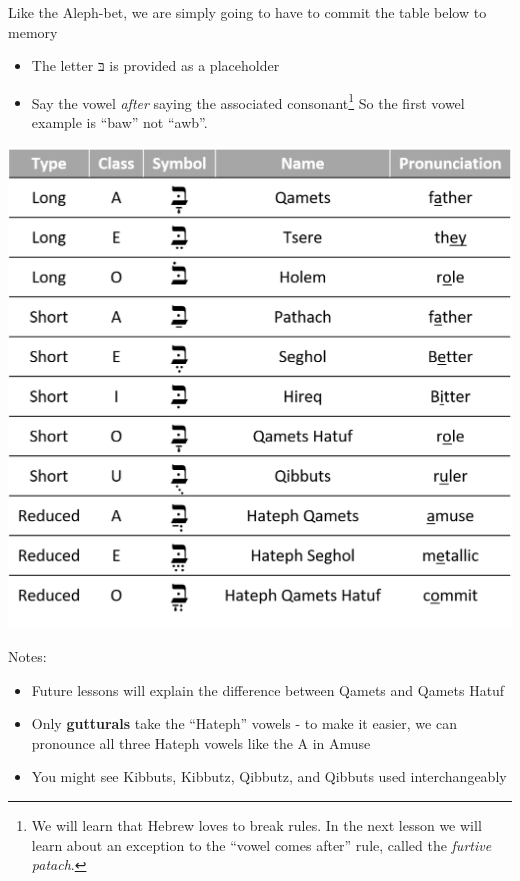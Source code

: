\documentclass[
]{turabian-researchpaper}
\providecommand{\tightlist}{%
  \setlength{\itemsep}{0pt}\setlength{\parskip}{0pt}}
\begin{document}
Like the Aleph-bet, we are simply going to have to commit the table below to memory

\begin{itemize}
\tightlist
\item
  The letter בּ is provided as a placeholder
\item
  Say the vowel \emph{after} saying the associated consonant\footnote{We will learn that Hebrew loves to break rules. In the next lesson we will learn about an exception to the ``vowel comes after'' rule, called the \emph{furtive patach}.} So the first vowel example is ``baw'' not ``awb''.
\end{itemize}

\begin{center}\includegraphics[width=500pt]{images/02.vowels_not_letters} \end{center}

Notes:

\begin{itemize}
\tightlist
\item
  Future lessons will explain the difference between Qamets and Qamets Hatuf
\item
  Only \textbf{gutturals} take the ``Hateph'' vowels - to make it easier, we can pronounce all three Hateph vowels like the A in Amuse
\item
  You might see Kibbuts, Kibbutz, Qibbutz, and Qibbuts used interchangeably
\end{itemize}
\end{document}
